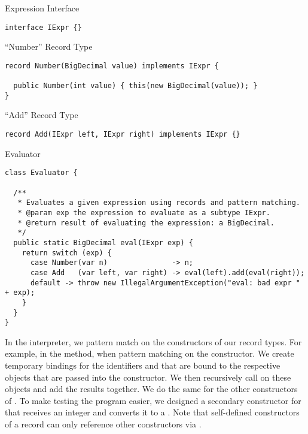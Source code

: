 \begin{cl}[]{Expression Interface}
\begin{lstlisting}[language=MyJava]
interface IExpr {}
\end{lstlisting}
\end{cl}

\begin{cl}[]{``Number'' Record Type}
\begin{lstlisting}[language=MyJava]
record Number(BigDecimal value) implements IExpr {
  
  public Number(int value) { this(new BigDecimal(value)); }
}
\end{lstlisting}
\end{cl}

\begin{cl}[]{``Add'' Record Type}
\begin{lstlisting}[language=MyJava]
record Add(IExpr left, IExpr right) implements IExpr {}
\end{lstlisting}
\end{cl}

\begin{cl}[]{Evaluator}
\begin{lstlisting}[language=MyJava]
class Evaluator {

  /**
   * Evaluates a given expression using records and pattern matching.
   * @param exp the expression to evaluate as a subtype IExpr.
   * @return result of evaluating the expression: a BigDecimal.
   */
  public static BigDecimal eval(IExpr exp) {
    return switch (exp) {
      case Number(var n)               -> n;
      case Add   (var left, var right) -> eval(left).add(eval(right));
      default -> throw new IllegalArgumentException("eval: bad expr " + exp);
    }
  }
}
\end{lstlisting}
\end{cl}

In the interpreter, we pattern match on the constructors of our record types. For example, in the  method, when pattern matching on the  constructor. We create temporary bindings for the identifiers  and  that are bound to the respective  objects that are passed into the constructor. We then recursively call  on these objects and add the results together. We do the same for the other constructors of . To make testing the program easier, we designed a secondary constructor for  that receives an integer and converts it to a . Note that self-defined constructors of a record can only reference other constructors via .

